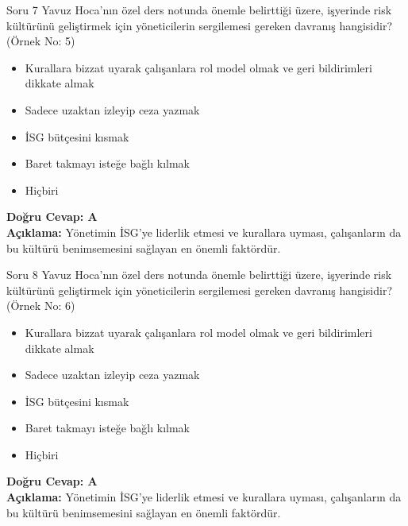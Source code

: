 \documentclass[12pt,a4paper]{article}
\begin{document}
\begin{testcard}{Soru 7}
    Yavuz Hoca'nın özel ders notunda önemle belirttiği üzere, işyerinde risk kültürünü geliştirmek için yöneticilerin sergilemesi gereken davranış hangisidir? (Örnek No: 5)
    \begin{itemize}
        \item[A)] Kurallara bizzat uyarak çalışanlara rol model olmak ve geri bildirimleri dikkate almak
        \item[B)] Sadece uzaktan izleyip ceza yazmak
        \item[C)] İSG bütçesini kısmak
        \item[D)] Baret takmayı isteğe bağlı kılmak
        \item[E)] Hiçbiri
    \end{itemize}
    \tcblower
    \textbf{Doğru Cevap: A} \\
    \textbf{Açıklama:} Yönetimin İSG'ye liderlik etmesi ve kurallara uyması, çalışanların da bu kültürü benimsemesini sağlayan en önemli faktördür.
\end{testcard}

\begin{testcard}{Soru 8}
    Yavuz Hoca'nın özel ders notunda önemle belirttiği üzere, işyerinde risk kültürünü geliştirmek için yöneticilerin sergilemesi gereken davranış hangisidir? (Örnek No: 6)
    \begin{itemize}
        \item[A)] Kurallara bizzat uyarak çalışanlara rol model olmak ve geri bildirimleri dikkate almak
        \item[B)] Sadece uzaktan izleyip ceza yazmak
        \item[C)] İSG bütçesini kısmak
        \item[D)] Baret takmayı isteğe bağlı kılmak
        \item[E)] Hiçbiri
    \end{itemize}
    \tcblower
    \textbf{Doğru Cevap: A} \\
    \textbf{Açıklama:} Yönetimin İSG'ye liderlik etmesi ve kurallara uyması, çalışanların da bu kültürü benimsemesini sağlayan en önemli faktördür.
\end{testcard}
\end{document}
